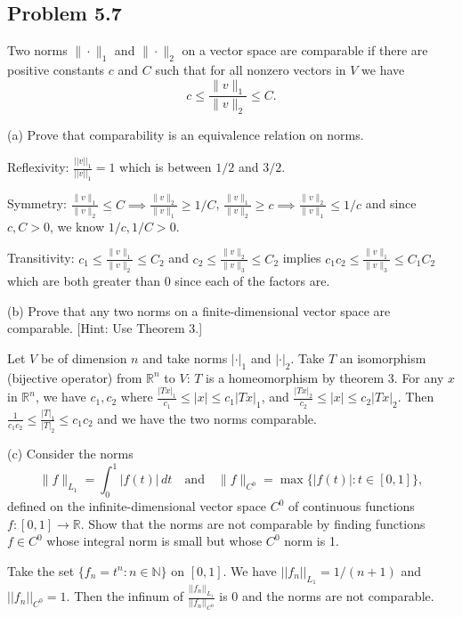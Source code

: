 \documentclass{amsart}
\begin{document}
\newpage

\subsection*{Problem 5.7} Two norms \( \| \cdot \|_1 \) and \( \| \cdot \|_2 \) on a vector 
space are comparable if there are positive constants \( c \) and \( C \) such that for all 
nonzero vectors in \( V \) we have
\[
c \leq \frac{\| v \|_1}{\| v \|_2} \leq C.
\]

(a) Prove that comparability is an equivalence relation on norms.

\medskip \noindent Reflexivity: $\frac{||v||_1}{||v||_1}=1$ which is between $1/2$ and $3/2$.

\medskip \noindent Symmetry:  $\frac{\| v \|_1}{\| v \|_2} \leq C\implies\frac{\| v \|_2}{\| v \|_1} \geq 1/C$, 
$\frac{\| v \|_1}{\| v \|_2} \geq c\implies\frac{\| v \|_2}{\| v \|_1} \leq 1/c$ and since $c, C>0$, we know $1/c, 1/C>0$.

\medskip \noindent Transitivity: $c_1 \leq \frac{\| v \|_1}{\| v \|_2} \leq C_2$ and $c_2 \leq \frac{\| v \|_2}{\| v \|_3} \leq C_2$
implies $c_1c_2 \leq \frac{\| v \|_1}{\| v \|_3} \leq C_1C_2$ which are both greater than $0$ since each of the factors are.

\bigskip

(b) Prove that any two norms on a finite-dimensional vector space are comparable. [Hint: Use Theorem 3.]

\medskip \noindent Let $V$ be of dimension $n$ and take norms $|\cdot|_1$ and $|\cdot|_2$. Take $T$ an isomorphism (bijective operator) from
$\mathbb{R}^n$ to $V$: $T$ is a homeomorphism by theorem 3. For any $x$ in $\mathbb{R}^n$, we have 
$c_1, c_2$ where $\frac{|Tx|_1}{c_1}\leq |x|\leq c_1|Tx|_1$, and $\frac{|Tx|_2}{c_2}\leq |x|\leq c_2|Tx|_2$. Then 
$\frac{1}{c_1c_2}\leq \frac{|T|_1}{|T|_2}\leq c_1c_2$ and we have the two norms comparable.

(c) Consider the norms
\[
\| f \|_{L_1} = \int_0^1 | f(t) | \, dt \quad \text{and} \quad \| f \|_{C^0} = \max \{ | f(t) | : t \in [0,1] \},
\]
defined on the infinite-dimensional vector space \( C^0 \) of continuous functions 
\( f : [0,1] \rightarrow \mathbb{R} \). Show that the norms are not comparable by 
finding functions \( f \in C^0 \) whose integral norm is small but whose \( C^0 \) norm is 1.


\medskip \noindent Take the set $\{f_n=t^n: n\in\mathbb{N}\}$ on $[0,1]$. We have
$||f_n||_{L_1}=1/(n+1)$ and $||f_n||_{C^0}=1$. Then the infinum of $\frac{||f_n||_{L_1}}{||f_n||_{C^0}}$ is
$0$ and the norms are not comparable.
\end{document}

